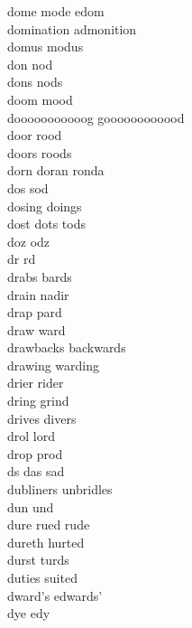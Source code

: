 dome mode edom\\
domination admonition\\
domus modus\\
don nod\\
dons nods\\
doom mood\\
dooooooooooog goooooooooood\\
door rood\\
doors roods\\
dorn doran ronda \\
dos sod\\
dosing doings\\
dost dots tods\\
doz odz\\
dr rd\\
drabs bards\\
drain nadir\\
drap pard\\
draw ward\\
drawbacks backwards\\
drawing warding\\
drier rider\\
dring grind\\
drives divers\\
drol lord\\
drop prod\\
ds das sad \\
dubliners unbridles\\
dun und\\
dure rued rude\\
dureth hurted\\
durst turds\\
duties suited\\
dward's edwards' \\
dye edy\\

